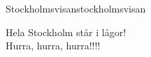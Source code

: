\begin{song}{Stockholmsvisan}{stockholmsvisan}
\begin{vers}
Hela Stockholm står i lågor!\\
Hurra, hurra, hurra!!!!\\
\end{vers}
\end{song}
